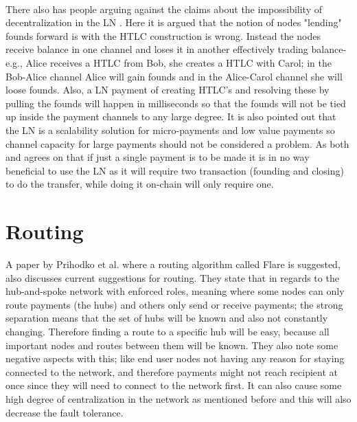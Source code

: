 \documentclass[informationsecurity]{gucmasterproject}
\begin{document}
\paragraph{}
There also has people arguing against the claims about the impossibility of decentralization in the LN \cite{answer1}\cite{answer2}.
Here it is argued that the notion of nodes "lending" founds forward is with the HTLC construction is wrong.
Instead the nodes receive balance in one channel and loses it in another effectively trading balance-e.g., Alice receives a HTLC from Bob, she creates a HTLC with Carol; in the Bob-Alice channel Alice will gain founds and in the Alice-Carol channel she will loose founds.
Also, a LN payment of creating HTLC's and resolving these by pulling the founds will happen in milliseconds so that the founds will not be tied up inside the payment channels to any large degree. It is also pointed out that the LN is a scalability solution for micro-payments and low value payments so channel capacity for large payments should not be considered a problem. As both \cite{sceptic2} and \cite{answer1} agrees on that if just a single payment is to be made it is in no way beneficial to use the LN as it will require two transaction (founding and closing) to do the transfer, while doing it on-chain will only require one.


\section{Routing}
A paper by Prihodko et al. where a routing algorithm called Flare\cite{prihodko2016flare} is suggested, also discusses current suggestions for routing. 
They state that in regards to the hub-and-spoke network with enforced roles, meaning where some nodes can only route payments (the hubs) and others only send or receive payments; the strong separation means that the set of hubs will be known and also not constantly changing. Therefore finding a route to a specific hub will be easy, because all important nodes and routes between them will be known.
They also note some negative aspects with this; like 
end user nodes not having any reason for staying connected to the network, and therefore payments might not reach recipient at once since they will need to connect to the network first.
It can also cause some high degree of centralization in the network as mentioned before and this will also decrease the fault tolerance.
\end{document}
